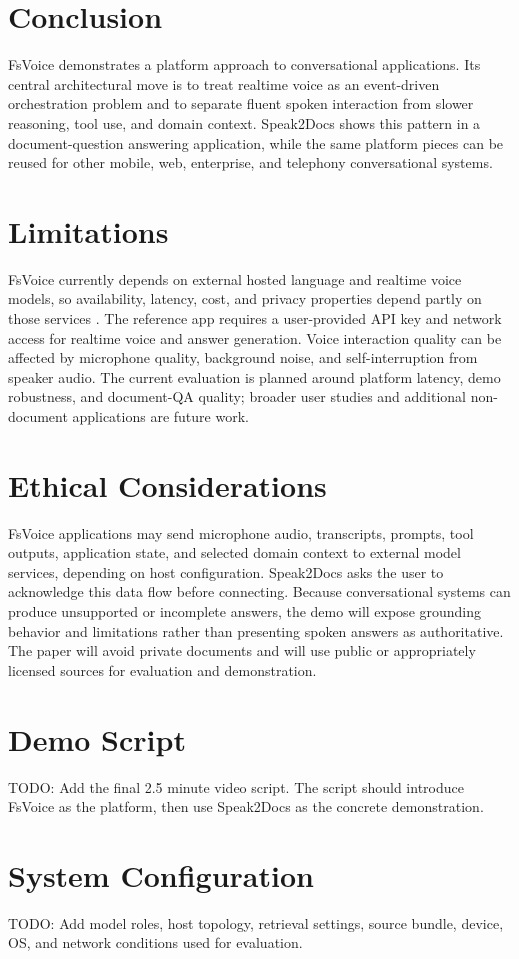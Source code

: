 \documentclass[11pt]{article}
\begin{document}
\section{Conclusion}

FsVoice demonstrates a platform approach to conversational applications. Its central architectural move is to treat realtime voice as an event-driven orchestration problem and to separate fluent spoken interaction from slower reasoning, tool use, and domain context. Speak2Docs shows this pattern in a document-question answering application, while the same platform pieces can be reused for other mobile, web, enterprise, and telephony conversational systems.

\section*{Limitations}

FsVoice currently depends on external hosted language and realtime voice models, so availability, latency, cost, and privacy properties depend partly on those services \citep{openaiRealtime,openaiResponses}. The reference app requires a user-provided API key and network access for realtime voice and answer generation. Voice interaction quality can be affected by microphone quality, background noise, and self-interruption from speaker audio. The current evaluation is planned around platform latency, demo robustness, and document-QA quality; broader user studies and additional non-document applications are future work.

\section*{Ethical Considerations}

FsVoice applications may send microphone audio, transcripts, prompts, tool outputs, application state, and selected domain context to external model services, depending on host configuration. Speak2Docs asks the user to acknowledge this data flow before connecting. Because conversational systems can produce unsupported or incomplete answers, the demo will expose grounding behavior and limitations rather than presenting spoken answers as authoritative. The paper will avoid private documents and will use public or appropriately licensed sources for evaluation and demonstration.




\appendix
\section{Demo Script}

TODO: Add the final 2.5 minute video script. The script should introduce FsVoice as the platform, then use Speak2Docs as the concrete demonstration.

\section{System Configuration}

TODO: Add model roles, host topology, retrieval settings, source bundle, device, OS, and network conditions used for evaluation.
\end{document}
